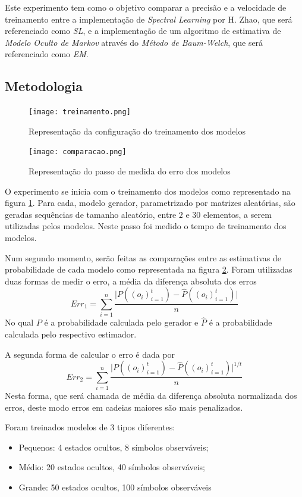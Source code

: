 \documentclass{subfiles}
\begin{document}
Este experimento tem como o objetivo comparar a precisão e a velocidade de treinamento entre a implementação de \textit{Spectral Learning} por H. Zhao, que será referenciado como \textit{SL}, e a implementação de um algoritmo de estimativa de \textit{Modelo Oculto de Markov} através do \textit{Método de Baum-Welch}, que será referenciado como \textit{EM}.

\subsection{Metodologia}

\begin{figure}
    \texttt{[image: treinamento.png]}
    \caption{Representação da configuração do treinamento dos modelos}
    \label{fig:trein}
\end{figure}

\begin{figure}
    \texttt{[image: comparacao.png]}
    \caption{Representação do passo de medida do erro dos modelos}
    \label{fig:comp}
\end{figure}

O experimento se inicia com o treinamento dos modelos como representado na figura \ref{fig:trein}. Para cada, modelo gerador, parametrizado por matrizes aleatórias, são geradas sequências de tamanho aleatório, entre $2$ e $30$ elementos, a serem utilizadas pelos modelos. Neste passo foi medido o tempo de treinamento dos modelos.

Num segundo momento, serão feitas as comparações entre as estimativas de probabilidade de cada modelo como representada na figura \ref{fig:comp}. Foram utilizadas duas formas de medir o erro, a média da diferença absoluta dos erros
\[
    Err_1 = \sum_{i=1}^n \frac{\vert P((o_i)_{i=1}^t) - \hat{P}((o_i)_{i=1}^t) \vert}{n}
\]
No qual $P$ é a probabilidade calculada pelo gerador e $\hat{P}$ é a probabilidade calculada pelo respectivo estimador.

A segunda forma de calcular o erro é dada por
\[
    Err_2 = \sum_{i=1}^n \frac{\vert P((o_i)_{i=1}^t) - \hat{P}((o_i)_{i=1}^t) \vert^{1/t}}{n}
\]
Nesta forma, que será chamada de média da diferença absoluta normalizada dos erros, deste modo erros em cadeias maiores são mais penalizados.

Foram treinados modelos de 3 tipos diferentes:
\begin{itemize}
    \item Pequenos: 4 estados ocultos, 8 símbolos observáveis;
    \item Médio: 20 estados ocultos, 40 símbolos observáveis;
    \item Grande: 50 estados ocultos, 100 símbolos observáveis
\end{itemize}
\end{document}
